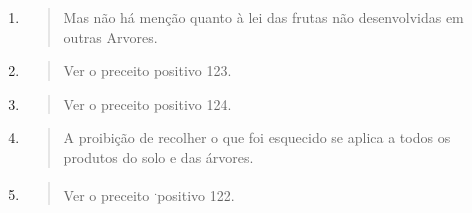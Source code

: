 \begin{enumerate}
\def\labelenumi{\arabic{enumi}.}
\setcounter{enumi}{379}
\item
  \begin{quote}
  Mas não há menção quanto à lei das frutas não desenvolvidas em outras
  Arvores.
  \end{quote}
\item
  \begin{quote}
  Ver o preceito positivo 123.
  \end{quote}
\item
  \begin{quote}
  Ver o preceito positivo 124.
  \end{quote}
\item
  \begin{quote}
  A proibição de recolher o que foi esquecido se aplica a todos os
  produtos do solo e das árvores.
  \end{quote}
\item
  \begin{quote}
  Ver o preceito \textsuperscript{.}positivo 122.
  \end{quote}
\end{enumerate}

